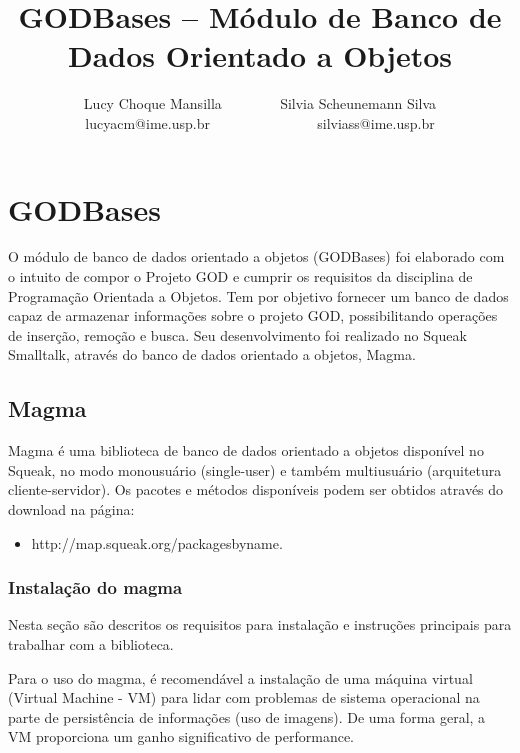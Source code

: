 \documentclass[a4paper, 10pt]{article}
\title{GODBases – Módulo de Banco de Dados Orientado a Objetos}
\author{Lucy Choque Mansilla ~~~~~~~ Silvia Scheunemann Silva\\
lucyacm@ime.usp.br ~~~~~~~~~~~~~~ silviass@ime.usp.br}
\begin{document}
\maketitle

\section{GODBases}

O módulo de banco de dados orientado a objetos (GODBases) foi elaborado com o intuito de compor o Projeto GOD e cumprir os requisitos da disciplina de Programação Orientada a Objetos. Tem por objetivo fornecer um banco de dados capaz de armazenar informações sobre o projeto GOD, possibilitando operações de inserção, remoção e busca. Seu desenvolvimento foi realizado no Squeak Smalltalk, através do banco de dados orientado a objetos, Magma.    


\subsection{Magma}
Magma é uma biblioteca de banco de dados orientado a objetos disponível no Squeak, no modo monousuário (single-user) e também multiusuário (arquitetura cliente-servidor). Os pacotes e métodos disponíveis podem ser obtidos através do download na página:
\begin{itemize}
\item{http://map.squeak.org/packagesbyname.}
\end{itemize}

\subsubsection{Instalação do magma}
Nesta seção são descritos os requisitos para instalação e instruções principais para trabalhar com a biblioteca.


Para o uso do magma, é recomendável a instalação de uma máquina virtual (Virtual Machine - VM) para lidar com problemas de sistema operacional na parte de persistência de informações (uso de imagens). De uma forma geral, a VM proporciona um ganho significativo de performance.
\end{document}
